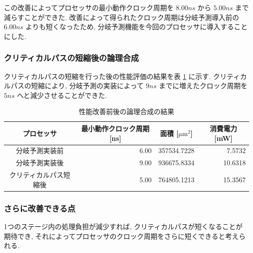 \documentclass[../improvements.tex]{subfiles}
\begin{document}
  この改善によってプロセッサの最小動作クロック周期を $8.00\unit{ns}$ から $5.00\unit{ns}$ まで減らすことができた.
  改善によって得られたクロック周期は分岐予測導入前の $6.00\unit{ns}$ よりも短くなったため, 
  分岐予測機能を今回のプロセッサに導入することにした.

  \subsubsection{クリティカルパスの短縮後の論理合成}
  クリティカルパスの短縮を行った後の性能評価の結果を表 \ref{table:logic-synthesis-improved} に示す.
  クリティカルパスの短縮により, 分岐予測の実装によって $9\unit{ns}$ までに増えたクロック周期を
  $5\unit{ns}$ へと減少させることができた.

  \begin{table}[t]
    \centering
    \caption{性能改善前後の論理合成の結果}
    \label{table:logic-synthesis-improved}
    \begin{tabular}{|c|r|r|r|}
    \hline
    プロセッサ & \multicolumn{1}{c|}{最小動作クロック周期 {[}\unit{ns}{]}} & \multicolumn{1}{c|}{面積 {[}$\unit{\um}^2${]}} & \multicolumn{1}{c|}{消費電力 {[}\unit{\mW}{]}} \\ \hline
    分岐予測実装前 & 6.00 & 357534.7228 & 7.5732 \\
    分岐予測実装後 & 9.00 & 936675.8334 & 10.6318 \\
    クリティカルパス短縮後 & 5.00 & 764805.1213 & 15.3567 \\ \hline
    \end{tabular}
  \end{table}

  \subsubsection{さらに改善できる点}
  1つのステージ内の処理負担が減少すれば, クリティカルパスが短くなることが期待でき, 
  それによってプロセッサのクロック周期をさらに短くできると考えられる.
\end{document}
